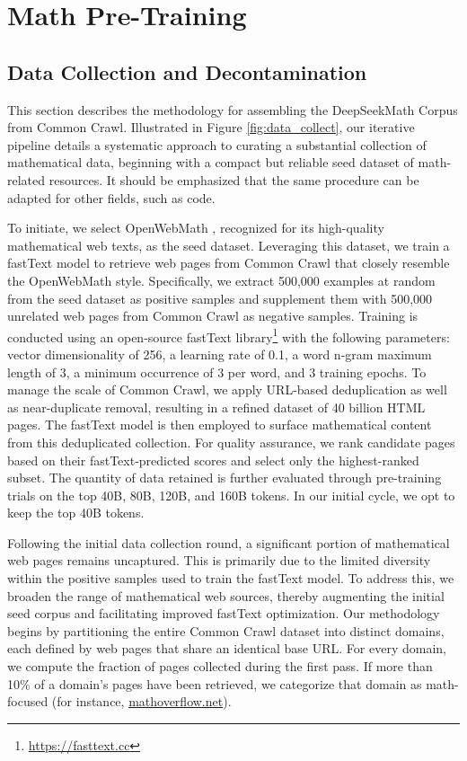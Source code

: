 \section{Math Pre-Training}

\subsection{Data Collection and Decontamination} This section describes the methodology for assembling the DeepSeekMath Corpus from Common Crawl. Illustrated in Figure \ref{fig:data_collect}, our iterative pipeline details a systematic approach to curating a substantial collection of mathematical data, beginning with a compact but reliable seed dataset of math-related resources. It should be emphasized that the same procedure can be adapted for other fields, such as code.

To initiate, we select OpenWebMath \citep{openwebmath}, recognized for its high-quality mathematical web texts, as the seed dataset. Leveraging this dataset, we train a fastText model \citep{joulin2016fasttext} to retrieve web pages from Common Crawl that closely resemble the OpenWebMath style. Specifically, we extract 500,000 examples at random from the seed dataset as positive samples and supplement them with 500,000 unrelated web pages from Common Crawl as negative samples. Training is conducted using an open-source fastText library\footnote{\url{https://fasttext.cc}} with the following parameters: vector dimensionality of 256, a learning rate of 0.1, a word n-gram maximum length of 3, a minimum occurrence of 3 per word, and 3 training epochs. To manage the scale of Common Crawl, we apply URL-based deduplication as well as near-duplicate removal, resulting in a refined dataset of 40 billion HTML pages. The fastText model is then employed to surface mathematical content from this deduplicated collection. For quality assurance, we rank candidate pages based on their fastText-predicted scores and select only the highest-ranked subset. The quantity of data retained is further evaluated through pre-training trials on the top 40B, 80B, 120B, and 160B tokens. In our initial cycle, we opt to keep the top 40B tokens.

Following the initial data collection round, a significant portion of mathematical web pages remains uncaptured. This is primarily due to the limited diversity within the positive samples used to train the fastText model. To address this, we broaden the range of mathematical web sources, thereby augmenting the initial seed corpus and facilitating improved fastText optimization. Our methodology begins by partitioning the entire Common Crawl dataset into distinct domains, each defined by web pages that share an identical base URL. For every domain, we compute the fraction of pages collected during the first pass. If more than 10\% of a domain’s pages have been retrieved, we categorize that domain as math-focused (for instance, \url{mathoverflow.net}). 


